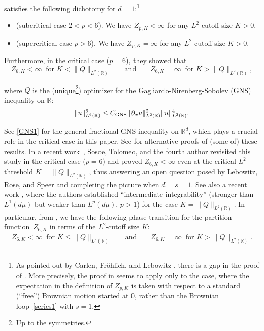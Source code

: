 \documentclass[letterpaper, 11pt,  reqno]{amsart}
\newcommand{\noi}{\noindent}
\newcommand{\R}{\mathbb{R}}
\newcommand{\dx}{\partial_x}
\numberwithin{equation}{section}
\numberwithin{theorem}{section}
\newcommand{\GNS}{\textup{GNS}}
\begin{document}
\noi
satisfies
the following dichotomy
for $d = 1$:\footnote{As pointed out by 
Carlen, Fr\"ohlich, and Lebowitz 
\cite[p.\,315]{CFL}, 
there is a gap 
in the proof of \cite[Theorem~2.2]{LRS}.
More precisely, 
 the proof in \cite{LRS} seems to apply only to the case, where the expectation in the definition of $Z_{p,K}$ is taken with respect to a standard (``free'') Brownian motion started at 0, rather than the 
Brownian loop~\eqref{series1} with $s = 1$.} 

\smallskip 

\begin{itemize}
\item[(i)] 
(subcritical case $2 < p < 6$).
We have 
 $Z_{p, K} < \infty $  for any $L^2$-cutoff size $K > 0$, 


\smallskip

\item[(ii)] 
(supercritical case $p > 6$).
We have  $Z_{p, K} = \infty$  for any $L^2$-cutoff size $K > 0$.


\end{itemize}

\smallskip

\noi
Furthermore, in the 
critical case ($p = 6$), they showed that  
\[
Z_{6, K}<\infty \ \text{ for } K<\|Q\|_{L^2(\R)}
\qquad
\text{and}
\qquad
Z_{6, K}=\infty \ \text{ for } K>\|Q\|_{L^2(\R)}, 
\]

\noi
where $Q$ is 
 the \textup{(}unique\footnote{Up to the symmetries.}\textup{)} optimizer for the Gagliardo-Nirenberg-Sobolev (GNS) inequality 
on $\R$:
\begin{equation*}%
\|u\|_{L^6(\R)}^6 \le C_{\GNS}\|\dx u\|^{2}_{L^2(\R)}
\|u\|^{4}_{L^2(\R)}.
\end{equation*}

\noi
See 
\eqref{GNS1} for the general fractional GNS inequality on $\R^d$, 
which plays a crucial role in the critical case in this paper.
See \cite{BO94, OST1, LW22}
for alternative proofs of (some of) these results.
In a recent work~\cite{OST1}, 
Sosoe, Tolomeo, and the fourth author
revisited this study 
in the critical case ($p = 6$)
and 
proved 
$Z_{6, K} < \infty$
even at the critical $L^2$-threshold $K = \|Q\|_{L^2(\R)}$, 
thus answering an open question posed by Lebowitz, Rose, and Speer
\cite{LRS}
and completing the picture
when $d = s = 1$.
See also a recent work \cite{HN},
where the authors
established
``intermediate integrability''
(stronger than $L^1(d\mu)$ but weaker than 
$ L^p(d\mu)$, $p > 1$)
for the case $K = \|Q\|_{L^2(\R)}$.
In particular, from \cite{LRS, BO94, OST1}, we have
 the following phase transition for the partition
function~$Z_{6, K}$ in terms of the $L^2$-cutoff size $K$:
\begin{align}
Z_{6, K}<\infty \ \text{ for } K\le \|Q\|_{L^2(\R)}
\qquad
\text{and}
\qquad
Z_{6, K}=\infty \ \text{ for } K>\|Q\|_{L^2(\R)}.
\label{phase1}
\end{align}
\end{document}
